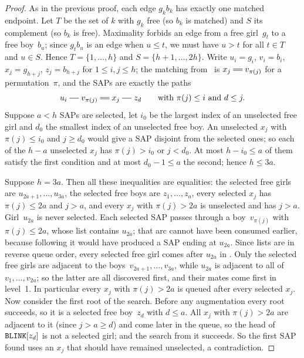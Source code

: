 \begin{proof}
As in the previous proof, each edge $g_kb_k$ has exactly one matched
endpoint. Let $T$ be the set of $k$ with $g_k$ free (so $b_k$ is matched)
and $S$ its complement (so $b_k$ is free). Maximality forbids an edge from a
free girl~$g_t$ to a free boy~$b_u$; since $g_tb_u$ is an edge when $u\le
t$, we must have $u>t$ for all $t\in T$ and $u\in S$. Hence
$T=\{1,\ldots,h\}$ and $S=\{h+1,\ldots,2h\}$. Write $u_i=g_i$, $v_i=b_i$,
$x_j=g_{h+j}$, $z_j=b_{h+j}$ for $1\le i,j\le h$; the matching from~ is
$x_j\db v_{\pi(j)}$ for a permutation~$\pi$, and the SAPs are exactly the
paths
\[
   u_i\sg v_{\pi(j)}\db x_j\sg z_d\qquad\text{with }\pi(j)\le i\text{ and }d\le j .
\]
Suppose $a<h$ SAPs are selected, let $i_0$ be the largest index of an
unselected free girl and $d_0$ the smallest index of an unselected free boy.
An unselected $x_j$ with $\pi(j)\le i_0$ and $j\ge d_0$ would give a SAP
disjoint from the selected ones; so each of the $h-a$ unselected $x_j$ has
$\pi(j)>i_0$ or $j<d_0$. At most $h-i_0\le a$ of them satisfy the first
condition and at most $d_0-1\le a$ the second; hence $h\le3a$.

Suppose $h=3a$. Then all these inequalities are equalities: the selected
free girls are $u_{2a+1},\ldots,u_{3a}$, the selected free boys are
$z_1,\ldots,z_a$, every selected $x_j$ has $\pi(j)\le2a$ and $j>a$, and
every $x_j$ with $\pi(j)>2a$ is unselected and has $j>a$. Girl~$u_{2a}$ is
never selected. Each selected SAP passes through a boy~$v_{\pi(j)}$ with
$\pi(j)\le2a$, whose list contains $u_{2a}$; that arc cannot have been
consumed earlier, because following it would have produced a SAP ending at
$u_{2a}$. Since lists are in reverse queue order, every selected free girl
comes after $u_{2a}$ in . Only the selected free girls are adjacent
to the boys~$v_{2a+1},\ldots,v_{3a}$, while $u_{2a}$ is adjacent to all of
$v_1,\ldots,v_{2a}$; so the latter are all discovered first, and their
mates come first in level~1. In particular every $x_j$ with $\pi(j)>2a$ is
queued after every selected $x_j$. Now consider the first root of the
search. Before any augmentation every root succeeds, so it is a selected
free boy~$z_d$ with $d\le a$. All $x_j$ with $\pi(j)>2a$ are adjacent to it
(since $j>a\ge d$) and come later in the queue, so the head of
$\texttt{BLINK}[z_d]$ is not a selected girl; and the search from it succeeds.
So the first SAP found uses an $x_j$ that should have remained unselected,
a contradiction.
\end{proof}

